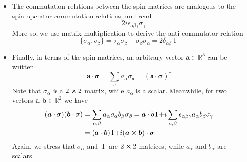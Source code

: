 \documentclass[11pt, a4paper]{article}
\renewcommand{\vec}[1]{\bm{#1}}  %
\newcommand{\II}{\operatorname{I}}  %
\begin{document}
\begin{itemize}
	\item The commutation relations between the spin matrices are analogous to the spin operator commutation relations, and read
	\begin{equation*}
		[\sigma_{\alpha}, \sigma_{\beta}] = 2i \epsilon_{\alpha \beta \gamma} \sigma_{\gamma}
	\end{equation*}
	More so, we use matrix multiplication to derive the anti-commutator relation
	\begin{equation*}
		\{\sigma_{\alpha}, \sigma_{\beta}\} = \sigma_{\alpha}\sigma_{\beta} + \sigma_{\beta}\sigma_{\alpha} = 2 \delta_{\alpha \beta} \II
	\end{equation*}
	
	\item Finally, in terms of the spin matrices, an arbitrary vector $ \vec{a} \in \mathbb{R}^{3} $ can be written 
	\begin{equation*}
		 \vec{a} \cdot \vec{\sigma} = \sum_{\alpha}a_{\alpha}\sigma_{\alpha} = (\vec{a} \cdot \vec{\sigma})^{\dagger} 
	\end{equation*}
	Note that $ \sigma_{\alpha} $ is a $ 2 \cross 2 $ matrix, while $ a_{\alpha} $ is a scalar. Meanwhile, for two vectors $ \vec{a}, \vec{b} \in \mathbb{R}^{2} $ we have
	\begin{align*}
		(\vec{a} \cdot \vec{\sigma})(\vec{b} \cdot \vec{\sigma}) &= \sum_{\alpha, \beta} a_{\alpha}\sigma_{\alpha}b_{\beta}\sigma_{\beta} = \vec{a}\cdot \vec{b}\II + i \sum_{\alpha, \beta} \epsilon_{\alpha \beta \gamma}a_{\alpha}b_{\beta} \sigma_{\gamma}\\
		& = (\vec{a}\cdot \vec{b})\II + i(\vec{a}\cross \vec{b})\cdot \vec{\sigma}
	\end{align*}
	Again, we stress that $ \sigma_{\alpha} $  and $ \II$ are $ 2 \cross 2 $ matrices, while $ a_{\alpha} $ and $ b_{\alpha} $ are scalars.
	
	
\end{itemize}
\end{document}

